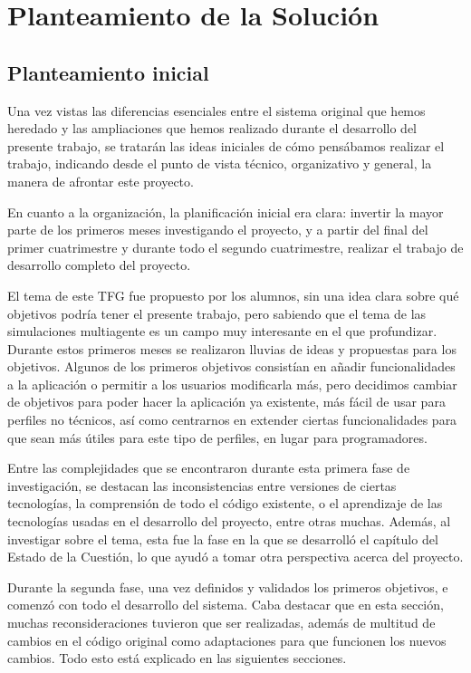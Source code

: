 \chapter{Planteamiento de la Solución}
\label{cap:planteamiento}
\section{Planteamiento inicial}

Una vez vistas las diferencias esenciales entre el sistema original que hemos heredado y las ampliaciones que hemos realizado durante el desarrollo del presente trabajo, se tratarán las ideas iniciales de cómo pensábamos realizar el trabajo, indicando desde el punto de vista técnico, organizativo y general, la manera de afrontar este proyecto.

En cuanto a la organización, la planificación inicial era clara: invertir la mayor parte de los primeros meses investigando el proyecto, y a partir del final del primer cuatrimestre y durante todo el segundo cuatrimestre, realizar el trabajo de desarrollo completo del proyecto.

El tema de este TFG fue propuesto por los alumnos, sin una idea clara sobre qué objetivos podría tener el presente trabajo, pero sabiendo que el tema de las simulaciones multiagente es un campo muy interesante en el que profundizar. Durante estos primeros meses se realizaron lluvias de ideas y propuestas para los objetivos. Algunos de los primeros objetivos consistían en añadir funcionalidades a la aplicación o permitir a los usuarios modificarla más, pero decidimos cambiar de objetivos para poder hacer la aplicación ya existente, más fácil de usar para perfiles no técnicos, así como centrarnos en extender ciertas funcionalidades para que sean más útiles para este tipo de perfiles, en lugar para programadores.

Entre las complejidades que se encontraron durante esta primera fase de investigación, se destacan las inconsistencias entre versiones de ciertas tecnologías, la comprensión de todo el código existente, o el aprendizaje de las tecnologías usadas en el desarrollo del proyecto, entre otras muchas. Además, al investigar sobre el tema, esta fue la fase en la que se desarrolló el capítulo del Estado de la Cuestión, lo que ayudó a tomar otra perspectiva acerca del proyecto.

Durante la segunda fase, una vez definidos y validados los primeros objetivos, e comenzó con todo el desarrollo del sistema. Caba destacar que en esta sección, muchas reconsideraciones tuvieron que ser realizadas, además de multitud de cambios en el código original como adaptaciones para que funcionen los nuevos cambios. Todo esto está explicado en las siguientes secciones.

